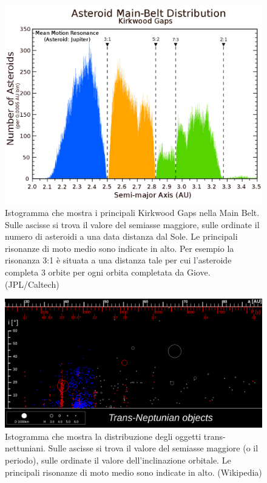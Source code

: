 \documentclass[a4paper,11pt,openright]{book}
\begin{document}
\begin{figure}
    \centering
    \includegraphics[scale=0.24]{figure/jupiter_resonances.png}
    \caption[Risonanze di moto medio con Giove.]{Istogramma che mostra i principali Kirkwood Gaps nella Main Belt. Sulle ascisse si trova il valore del semiasse maggiore, sulle ordinate il numero di asteroidi a una data distanza dal Sole. Le principali risonanze di moto medio sono indicate in alto. Per esempio la risonanza 3:1 è situata a una distanza tale per cui l'asteroide completa 3 orbite per ogni orbita completata da Giove. (JPL/Caltech)}
    \label{fig:jupiter_resonances}
\end{figure}

\begin{figure}
    \centering
    \includegraphics[width=\textwidth]{figure/neptune_resonances.png}
    \caption[Risonanze di moto medio con Nettuno.]{Istogramma che mostra la distribuzione degli oggetti trans-nettuniani. Sulle ascisse si trova il valore del semiasse maggiore (o il periodo), sulle ordinate il valore dell'inclinazione orbitale. Le principali risonanze di moto medio sono indicate in alto. (Wikipedia)}
    \label{fig:neptune_resonances}
\end{figure}
\end{document}
